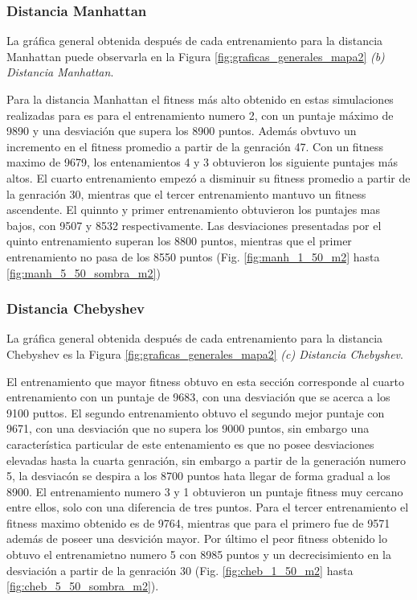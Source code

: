 \documentclass[conference]{IEEEtran}
\begin{document}
\subsubsection{Distancia Manhattan}
La gráfica general obtenida después de cada entrenamiento para la distancia Manhattan puede observarla en la Figura \ref{fig:graficas_generales_mapa2} \textit{(b) Distancia Manhattan}.

Para la distancia Manhattan el fitness más alto obtenido en estas simulaciones realizadas para es para el entrenamiento numero 2, con un puntaje máximo de 9890 y una desviación que supera los 8900 puntos. Además obvtuvo un incremento en el fitness promedio a partir de la genración 47. Con un fitness maximo de 9679, los entenamientos 4 y 3 obtuvieron los siguiente puntajes más altos. El cuarto entrenamiento empezó a disminuir su fitness promedio a partir de la genración 30, mientras que el tercer entrenamiento mantuvo un fitness ascendente. El quinnto y primer entrenamiento obtuvieron los puntajes mas bajos, con 9507 y 8532 respectivamente. Las desviaciones presentadas por el quinto entrenamiento superan los 8800 puntos, mientras que el primer entrenamiento no pasa de los 8550 puntos (Fig. \ref{fig:manh_1_50_m2} hasta \ref{fig:manh_5_50_sombra_m2})

\subsubsection{Distancia Chebyshev}
La gráfica general obtenida después de cada entrenamiento para la distancia Chebyshev es la Figura \ref{fig:graficas_generales_mapa2} \textit{(c) Distancia Chebyshev}.

El entrenamiento que mayor fitness obtuvo en esta sección corresponde al cuarto entrenamiento con un puntaje de 9683, con una desviación que se acerca a los 9100 puttos. El segundo entrenamiento obtuvo el segundo mejor puntaje con 9671, con una desviación que no supera los 9000 puntos, sin embargo una característica particular de este entenamiento es que no posee desviaciones elevadas hasta la cuarta genración, sin embargo a partir de la generación numero 5, la desviacón se despira a los 8700 puntos hata llegar de forma gradual a los 8900. El entrenamiento numero 3 y 1 obtuvieron un puntaje fitness muy cercano entre ellos, solo con una diferencia de tres puntos. Para el tercer entrenamiento el fitness maximo obtenido es de 9764, mientras que para el primero fue de 9571 además de poseer una desvición mayor. Por último el peor fitness obtenido lo obtuvo el entrenamietno numero 5 con 8985 puntos y un decrecisimiento en la desviación a partir de la genración 30 (Fig. \ref{fig:cheb_1_50_m2} hasta \ref{fig:cheb_5_50_sombra_m2}).
\end{document}
